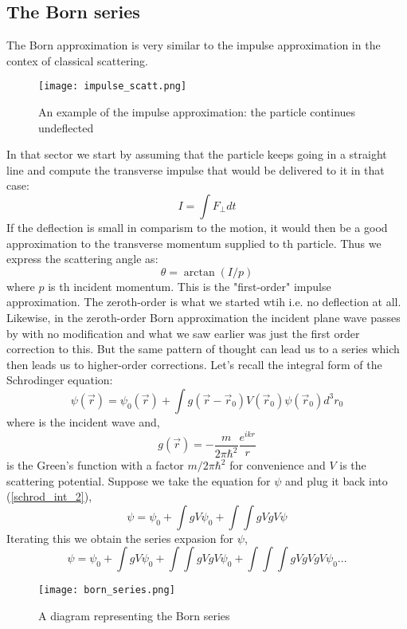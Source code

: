 \subsection{The Born series}
The Born approximation is very similar to the impulse approximation in the contex of classical scattering. 
\begin{figure}[h]
	\centering
	\texttt{[image: impulse\_scatt.png]}
	\caption{An example of the impulse approximation: the particle continues undeflected}
\end{figure}
In that sector we start by assuming that the particle keeps going in a straight line and compute the transverse impulse that would be delivered to it in that case:
\begin{equation}
I = \int F_{\perp} dt
\end{equation}
If the deflection is small in comparism to the motion, it would then be a good approximation to the transverse momentum supplied to th particle. Thus we express the scattering angle as:
\begin{equation}
\theta = \arctan(I/p)
\end{equation}
where $p$ is th incident momentum. This is the "first-order" impulse approximation. The zeroth-order is what we started wtih i.e. no deflection at all. Likewise, in the zeroth-order Born approximation the incident plane wave passes by with no modification and what we saw earlier was just the first order correction to this. But the same pattern of thought can lead us to a series which then leads us to higher-order corrections. Let's recall the integral form of the Schrodinger equation:
\begin{equation}
		\label{schrod_int_2}
	\psi (\vec{r}) = \psi_{0} (\vec{r}) + \int g(\vec{r} - \vec{r}_{0})V(\vec{r}_{0})\psi(\vec{r}_{0})d^{3}r_{0}
\end{equation}
where is the incident wave and,
$$g(\vec{r}) = -\frac{m}{2 \pi \hbar^{2}}\frac{e^{ikr}}{r}$$
is the Green's function with a factor $m/2 \pi \hbar^{2}$ for convenience and $V$ is the scattering potential.
Suppose we take the equation for $\psi$ and plug it back into (\ref{schrod_int_2}),
$$\psi = \psi_{0} + \int g V\psi_{0} + \int \int g V g V\psi$$
Iterating this we obtain the series expasion for $\psi$,
\begin{equation} 
	\label{dysonseries}
\psi = \psi_{0} + \int g V\psi_{0} + \int \int g V g V\psi_{0} + \int \int \int g V g V g V\psi_{0} ...
\end{equation}
\begin{figure}[h]
	\label{born_diag}
	\centering
	\texttt{[image: born\_series.png]}
	\caption{A diagram representing the Born series}
\end{figure}
